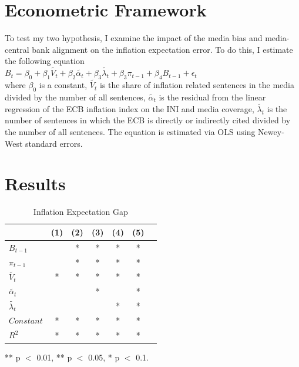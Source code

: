 \documentclass[review]{elsarticle}
\begin{document}
\section{Econometric Framework}\label{sec:Econometric Framework}
To test my two hypothesis, I examine the impact of the media bias and media-central bank alignment on the inflation expectation error. To do this, I estimate the following equation
\\
$B_t = \beta_0 + \beta_1 \tilde{V_t} + \beta_2 \tilde{\alpha_t} + \beta_3 \tilde{\lambda_t} +\beta_3 \pi_{t-1} + \beta_4 B_{t-1} + \epsilon_t$ \\
where $\beta_0$ is a constant, $\tilde{V_t}$ is the share of inflation related sentences in the media divided by the number of all sentences,  $\tilde{\alpha_t}$ is the residual from the linear regression of the ECB inflation index on the INI and media coverage, $\tilde{\lambda_t}$ is the number of sentences in which the ECB is directly or indirectly cited divided by the number of all sentences. The equation is estimated via OLS using Newey-West standard errors.
\newpage
\section{Results}\label{sec:Results}

\begin{table}[!ht]
\centering 
  \caption{Inflation Expectation Gap} 
  \label{tab:Inflation Expectation Gap}
\begin{tabular}{l*{6}{c}}   
\toprule
                    & (1) & (2) & (3) & (4) & (5) \\
\midrule
$B_{t-1}$           &     &  *  &  *  &  *  &  *  \\
$\pi_{t-1}$         &     &  *  &  *  &  *  &  *  \\
$\tilde{V_t}$       &  *  &  *  &  *  &  *  &  *  \\
$\tilde{\alpha_t}$  &     &     &  *  &     &  *  \\
$\tilde{\lambda_t}$ &     &     &     &  *  &  *  \\
$Constant$          &  *  &  *  &  *  &  *  &  *  \\
\midrule
$R^2$               &  *  &  *  &  *  &  *  &  *  \\
\bottomrule
\end{tabular} 
\parbox{0.8\textwidth}{\centering \small *** p $<$ 0.01, ** p $<$ 0.05, * p $<$ 0.1.}
\end{table}
\end{document}
